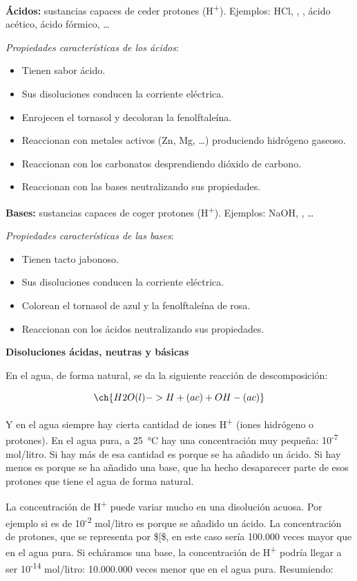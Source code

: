 \documentclass[
  spanish,
]{article}
\providecommand{\tightlist}{%
  \setlength{\itemsep}{0pt}\setlength{\parskip}{0pt}}
\begin{document}
\textbf{Ácidos:} sustancias capaces de ceder protones
(H\textsuperscript{+}). Ejemplos: HCl, , , ácido
acético, ácido fórmico, \ldots{}

\emph{Propiedades características de los ácidos}:

\begin{itemize}
\tightlist
\item
  Tienen sabor ácido.
\item
  Sus disoluciones conducen la corriente eléctrica.
\item
  Enrojecen el tornasol y decoloran la fenolftaleína.
\item
  Reaccionan con metales activos (Zn, Mg, \ldots) produciendo hidrógeno
  gaseoso.
\item
  Reaccionan con los carbonatos desprendiendo dióxido de carbono.
\item
  Reaccionan con las bases neutralizando sus propiedades.
\end{itemize}

\textbf{Bases:} sustancias capaces de coger protones
(H\textsuperscript{+}). Ejemplos: NaOH, ,  \ldots{}

\emph{Propiedades características de las bases}:

\begin{itemize}
\tightlist
\item
  Tienen tacto jabonoso.
\item
  Sus disoluciones conducen la corriente eléctrica.
\item
  Colorean el tornasol de azul y la fenolftaleína de rosa.
\item
  Reaccionan con los ácidos neutralizando sus propiedades.
\end{itemize}

\textbf{Disoluciones ácidas, neutras y básicas}

En el agua, de forma natural, se da la siguiente reacción de
descomposición:

\[\ch{H2O (l) -> H+ (ac) + OH- (ac)}\]

Y en el agua siempre hay cierta cantidad de iones H\textsuperscript{+}
(iones hidrógeno o protones). En el agua pura, a
\qty{25}{\degreeCelsius} hay una concentración muy pequeña:
10\textsuperscript{-7} mol/litro. Si hay más de esa cantidad es porque
se ha añadido un ácido. Si hay menos es porque se ha añadido una base,
que ha hecho desaparecer parte de esos protones que tiene el agua de
forma natural.

La concentración de H\textsuperscript{+} puede variar mucho en una
disolución acuosa. Por ejemplo si es de 10\textsuperscript{-2} mol/litro
es porque se añadido un ácido. La concentración de protones, que se
representa por \${[}\$, en este caso sería 100.000 veces mayor
que en el agua pura. Si echáramos una base, la concentración de
H\textsuperscript{+} podría llegar a ser 10\textsuperscript{-14}
mol/litro: 10.000.000 veces menor que en el agua pura. Resumiendo:
\end{document}
